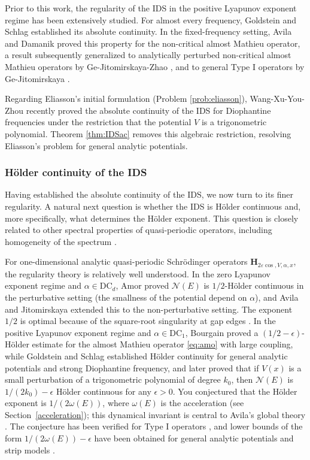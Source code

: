 \documentclass[reqno,11pt]{amsart}
\begin{document}
Prior to this work, the regularity of the IDS in the positive Lyapunov exponent regime has been extensively studied. For almost every frequency, Goldstein and Schlag \cite{GS1} established its absolute continuity. In the fixed-frequency setting, Avila and Damanik \cite{AD} proved this property for the non-critical almost Mathieu operator, a result subsequently generalized to analytically perturbed non-critical almost Mathieu operators by Ge-Jitomirskaya-Zhao \cite{GJZ}, and to general Type I operators by Ge-Jitomirskaya \cite{GJ}. 

Regarding Eliasson's initial formulation (Problem \ref{prob:eliasson}), Wang-Xu-You-Zhou \cite{WXYZ} recently proved the absolute continuity of the IDS for Diophantine frequencies under the restriction that the potential $V$ is a trigonometric polynomial. Theorem \ref{thm:IDSac} removes this algebraic restriction, resolving Eliasson's problem for general analytic potentials.



\subsubsection{H\"older continuity of the IDS}

Having established the absolute continuity of the IDS, we now turn to its finer regularity. A natural next question is whether the IDS is H\"older continuous and, more specifically, what determines the H\"older exponent. This question is closely related to other spectral properties of quasi-periodic operators, including homogeneity of the spectrum \cite{DGSV,LYZZ}.

For one-dimensional analytic quasi-periodic Schr\"odinger operators $\mathbf{H}_{2\varepsilon\cos,V,\alpha,x}$, the regularity theory is relatively well understood. In the zero Lyapunov exponent regime and $\alpha \in \mathrm{DC}_d$, Amor \cite{Amor} proved $\mathcal N(E)$ is $1/2$-H\"older continuous in the perturbative setting (the smallness of the potential depend on $\alpha$), and Avila and Jitomirskaya \cite{AJ2} extended this to the non-perturbative setting. The exponent $1/2$ is optimal because of the square-root singularity at gap edges \cite{Puig1}. In the positive Lyapunov exponent regime and $\alpha \in \mathrm{DC}_1$,  Bourgain \cite{Bou00} proved a $(1/2-\epsilon)$-H\"older estimate for the almost Mathieu operator \eqref{eq:amo} with large coupling, while Goldstein and Schlag \cite{GS01} established H\"older continuity for general analytic potentials and strong Diophantine frequency, and later \cite{GS1} proved that 
if $V(x)$ is a small perturbation of a trigonometric
polynomial of degree $k_0$, then $\mathcal{N}(E)$ is $1/(2k_0)-\epsilon$ H\"older continuous for any $\epsilon>0$.
 You \cite{You} conjectured that the H\"older exponent is $1/(2\omega(E))$, where $\omega(E)$ is the acceleration (see Section~\ref{acceleration}); this dynamical invariant is central to Avila's global theory \cite{avila}. The conjecture has been verified for Type I operators \cite{GJ}, and lower bounds of the form $1/(2\omega(E))-\epsilon$ have been obtained for general analytic potentials and strip models \cite{HS,HS1}.
\end{document}
